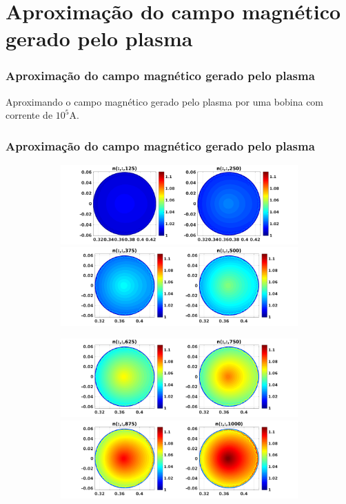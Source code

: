 \documentclass[aspectratio=169]{beamer}
\begin{document}
\section{Aproximação do campo magnético gerado pelo plasma}
\begin{frame}		
\frametitle{ Aproximação do campo magnético gerado pelo plasma}
Aproximando o campo magnético gerado pelo plasma por uma bobina com corrente de $10^5$A. 
\end{frame}

\begin{frame}		
\frametitle{Aproximação do campo magnético gerado pelo plasma }
\begin{figure}[H]
\begin{subfigure}{0.43\textwidth}
\includegraphics[scale=0.24]{../SImulacao_breakdown/PDE/ntod1B8.png}  
\includegraphics[scale=0.24]{../SImulacao_breakdown/PDE/ntod2B8.png}
\end{subfigure}
\begin{subfigure}{0.43\textwidth}
\includegraphics[scale=0.24]{../SImulacao_breakdown/PDE/ntod3B8.png} 
\includegraphics[scale=0.24]{../SImulacao_breakdown/PDE/ntod4B8.png} 

\end{subfigure}
\end{figure}
\end{frame}
\end{document}
